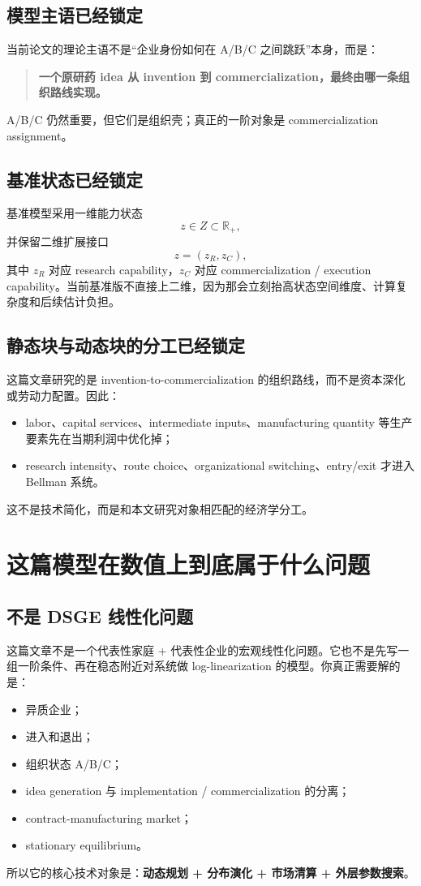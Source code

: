\documentclass[12pt]{ctexart}
\begin{document}
\subsection{模型主语已经锁定}
当前论文的理论主语不是“企业身份如何在 A/B/C 之间跳跃”本身，而是：
\begin{quote}
\textbf{一个原研药 idea 从 invention 到 commercialization，最终由哪一条组织路线实现。}
\end{quote}
A/B/C 仍然重要，但它们是组织壳；真正的一阶对象是 commercialization assignment。

\subsection{基准状态已经锁定}
基准模型采用一维能力状态
\[
z\in Z\subset \mathbb{R}_+,
\]
并保留二维扩展接口
\[
z=(z_R,z_C),
\]
其中 $z_R$ 对应 research capability，$z_C$ 对应 commercialization / execution capability。当前基准版不直接上二维，因为那会立刻抬高状态空间维度、计算复杂度和后续估计负担。

\subsection{静态块与动态块的分工已经锁定}
这篇文章研究的是 invention-to-commercialization 的组织路线，而不是资本深化或劳动力配置。因此：
\begin{itemize}[leftmargin=2em]
    \item labor、capital services、intermediate inputs、manufacturing quantity 等生产要素先在当期利润中优化掉；
    \item research intensity、route choice、organizational switching、entry/exit 才进入 Bellman 系统。
\end{itemize}
这不是技术简化，而是和本文研究对象相匹配的经济学分工。

\section{这篇模型在数值上到底属于什么问题}

\subsection{不是 DSGE 线性化问题}
这篇文章不是一个代表性家庭 + 代表性企业的宏观线性化问题。它也不是先写一组一阶条件、再在稳态附近对系统做 log-linearization 的模型。你真正需要解的是：
\begin{itemize}[leftmargin=2em]
    \item 异质企业；
    \item 进入和退出；
    \item 组织状态 A/B/C；
    \item idea generation 与 implementation / commercialization 的分离；
    \item contract-manufacturing market；
    \item stationary equilibrium。
\end{itemize}
所以它的核心技术对象是：\textbf{动态规划 + 分布演化 + 市场清算 + 外层参数搜索}。
\end{document}

